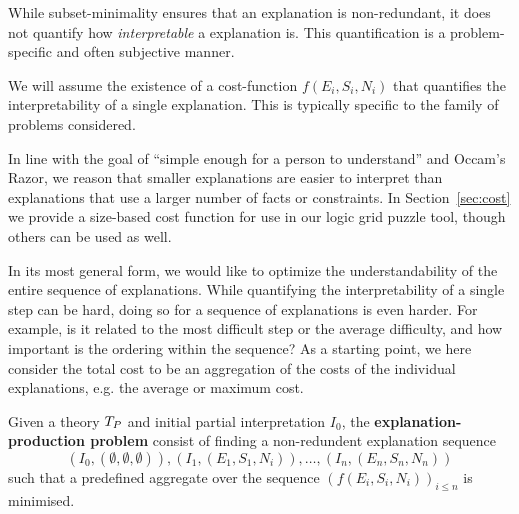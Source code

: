 While subset-minimality ensures that an explanation is non-redundant, it does not quantify how \textit{interpretable} a explanation is. 
This quantification is a problem-specific and often subjective manner. 

We will assume the existence of a cost-function $f(E_i,S_i,N_i)$ that quantifies the interpretability of a single explanation. 
This is typically specific to the family of problems considered.

In line with the goal of ``simple enough for a person to understand'' and Occam's Razor, we reason that smaller explanations are easier to interpret than explanations that use a larger number of facts or constraints. %
In Section~\ref{sec:cost} we provide a size-based cost function for use in our logic grid puzzle tool, though others can be used as well.

In its most general form, we would like to optimize the understandability of the entire sequence of explanations. 
While quantifying the interpretability of a single step can be hard, doing so for a sequence of explanations is even harder. For example, is it related to the most difficult step or the average difficulty, and how important is the ordering within the sequence?
As a starting point, we here consider the total cost to be an aggregation of the costs of the individual explanations, e.g. the average or maximum cost.

\begin{definition}
Given a theory $T_P$ and initial partial interpretation $I_0$, the \textbf{explanation-production problem} consist of finding a non-redundent explanation sequence
\[(I_0,(\emptyset,\emptyset,\emptyset)), (I_1,(E_1,S_1,N_i)), \dots ,(I_n,(E_n,S_n,N_n))\]
such that a predefined aggregate over the sequence $\left(f(E_i,S_i,N_i)\right)_{i\leq n}$ is minimised.
\end{definition} 

